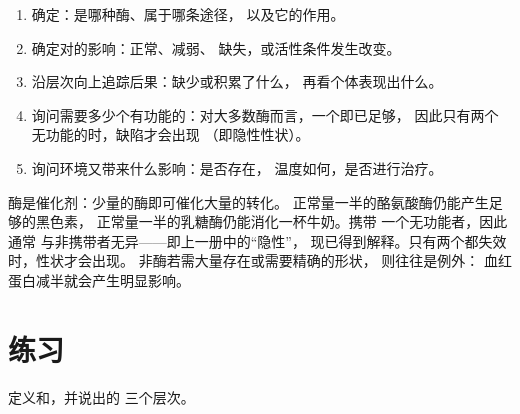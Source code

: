 \begin{method}[由基因推断性状]\label{met:g11:enzymes-and-phenotype:reason}
\begin{enumerate}
  \item 确定：是哪种酶、属于哪条途径，
        以及它的作用。
  \item 确定对的影响：正常、减弱、
        缺失，或活性条件发生改变。
  \item 沿层次向上追踪后果：缺少或积累了什么，
        再看个体表现出什么。
  \item 询问需要多少个有功能的：对大多数酶而言，一个即已足够，
        因此只有两个无功能的时，缺陷才会出现
        （即隐性性状）。
  \item 询问环境又带来什么影响：是否存在，
        温度如何，是否进行治疗。
\end{enumerate}
\end{method}

\begin{remark}[为何通常一个有功能的等位基因就足够]\label{rem:g11:enzymes-and-phenotype:recessive}
酶是催化剂：少量的酶即可催化大量的转化。
正常量一半的酪氨酸酶仍能产生足够的黑色素，
正常量一半的乳糖酶仍能消化一杯牛奶。携带
一个无功能者，因此通常
与非携带者无异——即上一册中的“隐性”，
现已得到解释。只有两个都失效时，性状才会出现。
非酶若需大量存在或需要精确的形状，
则往往是例外：
血红蛋白减半就会产生明显影响。
\end{remark}

\section{练习}

\begin{exercise}[$\star$]\label{exo:g11:enzymes-and-phenotype:1}
定义和，并说出的
三个层次。
\end{exercise}

